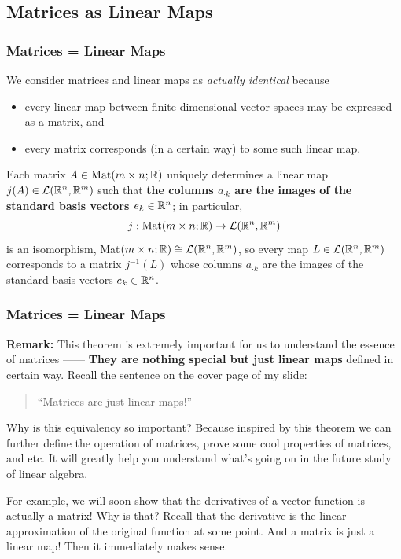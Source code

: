 \documentclass[12pt, t]{beamer}
\renewcommand{\emph}[1]{{\color{Turquoise3}\textsl{#1}}}
\newcommand{\remark}{\textbf{Remark: }}
\begin{document}
\subsection{Matrices as Linear Maps}
\begin{frame}
    \frametitle{\textbf{Matrices = Linear Maps}}
    We consider matrices and linear maps as \emph{actually identical} because
    \begin{itemize}
        \item every linear map between finite-dimensional vector spaces may be expressed as a matrix, and
        \item every matrix corresponds (in a certain way) to some such linear map.
    \end{itemize}
    Each matrix $A\in\text{Mat}(m\times n;\mathbb{R})$ uniquely determines a linear map $j(A)\in\mathcal{L}(\mathbb{R}^n,\mathbb{R}^m)$ such that \textbf{the columns $a_{\cdot k}$ are the images of the standard basis vectors $e_k\in\mathbb{R}^n$}; in particular,
    \[j:\text{Mat}(m\times n;\mathbb{R})\to\mathcal{L}(\mathbb{R}^n,\mathbb{R}^m)\]
    is an isomorphism, Mat$(m\times n;\mathbb{R})\cong\mathcal{L}(\mathbb{R}^n,\mathbb{R}^m)$, so every map $L\in\mathcal{L}(\mathbb{R}^n,\mathbb{R}^m)$ corresponds to a matrix $j^{-1}(L)$ whose columns $a_{\cdot k}$ are the images of the standard basis vectors $e_k\in\mathbb{R}^n$.
\end{frame}

\begin{frame}
    \frametitle{\textbf{Matrices = Linear Maps}}
    \remark This theorem is extremely important for us to understand the essence of matrices —— \textbf{They are nothing special but just linear maps} defined in certain way. Recall the sentence on the cover page of my slide:

    \begin{quote}
        \center
        ``Matrices are just linear maps!''\\
    \end{quote}

    \small
    Why is this equivalency so important? Because inspired by this theorem we can further define the operation of matrices, prove some cool properties of matrices, and etc. It will greatly help you understand what's going on in the future study of linear algebra.

    For example, we will soon show that the derivatives of a vector function is actually a matrix! Why is that? Recall that the derivative is the linear approximation of the original function at some point. And a matrix is just a linear map! Then it immediately makes sense.
\end{frame}
\end{document}
